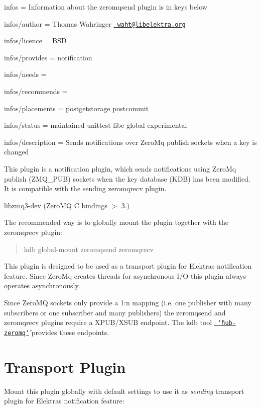 
\begin{DoxyItemize}
\item infos = Information about the zeromqsend plugin is in keys below
\item infos/author = Thomas Wahringer \href{mailto:waht@libelektra.org}{\texttt{ waht@libelektra.\+org}}
\item infos/licence = B\+SD
\item infos/provides = notification
\item infos/needs =
\item infos/recommends =
\item infos/placements = postgetstorage postcommit
\item infos/status = maintained unittest libc global experimental
\item infos/description = Sends notifications over Zero\+Mq publish sockets when a key is changed
\end{DoxyItemize}

This plugin is a notification plugin, which sends notifications using Zero\+Mq publish ({\ttfamily Z\+M\+Q\+\_\+\+P\+UB}) sockets when the key database (K\+DB) has been modified. It is compatible with the sending zeromqrecv plugin.


\begin{DoxyItemize}
\item {\ttfamily libzmq3-\/dev} (Zero\+MQ C bindings $>$ 3.)
\end{DoxyItemize}

The recommended way is to globally mount the plugin together with the zeromqrecv plugin\+:

\begin{quote}
kdb global-\/mount zeromqsend zeromqrecv \end{quote}


This plugin is designed to be used as a transport plugin for Elektra\textquotesingle{}s notification feature. Since Zero\+Mq creates threads for asynchronous I/O this plugin always operates asynchronously.

Since Zero\+MQ sockets only provide a 1\+:n mapping (i.\+e. one publisher with many subscribers or one subscriber and many publishers) the {\ttfamily zeromqsend} and {\ttfamily zeromqrecv} plugins require a X\+P\+U\+B/\+X\+S\+UB endpoint. The kdb tool \href{https://www.libelektra.org/tools/hub-zeromq}{\texttt{ \char`\"{}hub-\/zeromq\char`\"{}}} provides these endpoints.\hypertarget{autotoc_md910_autotoc_md913}{}\section{Transport Plugin}\label{autotoc_md910_autotoc_md913}
Mount this plugin globally with default settings to use it as {\itshape sending} transport plugin for Elektra\textquotesingle{}s notification feature\+:

